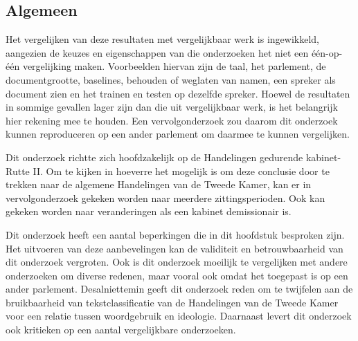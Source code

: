 \subsection{Algemeen}
Het vergelijken van deze resultaten met vergelijkbaar werk is ingewikkeld, aangezien de keuzes en eigenschappen van die onderzoeken het niet een één-op-één vergelijking maken. Voorbeelden hiervan zijn de taal, het parlement, de documentgrootte, baselines, behouden of weglaten van namen, een spreker als document zien en het trainen en testen op dezelfde spreker. Hoewel de resultaten in sommige gevallen lager zijn dan die uit vergelijkbaar werk, is het belangrijk hier rekening mee te houden. Een vervolgonderzoek zou daarom dit onderzoek kunnen reproduceren op een ander parlement om daarmee te kunnen vergelijken.\par
Dit onderzoek richtte zich hoofdzakelijk op de Handelingen gedurende kabinet-Rutte II. Om te kijken in hoeverre het mogelijk is om deze conclusie door te trekken naar de algemene Handelingen van de Tweede Kamer, kan er in vervolgonderzoek gekeken worden naar meerdere zittingsperioden. Ook kan gekeken worden naar veranderingen als een kabinet demissionair is.\par
Dit onderzoek heeft een aantal beperkingen die in dit hoofdstuk besproken zijn. Het uitvoeren van deze aanbevelingen kan de validiteit en betrouwbaarheid van dit onderzoek vergroten. Ook is dit onderzoek moeilijk te vergelijken met andere onderzoeken om diverse redenen, maar vooral ook omdat het toegepast is op een ander parlement. Desalniettemin geeft dit onderzoek reden om te twijfelen aan de bruikbaarheid van tekstclassificatie van de Handelingen van de Tweede Kamer voor een relatie tussen woordgebruik en ideologie. Daarnaast levert dit onderzoek ook kritieken op een aantal vergelijkbare onderzoeken.\par